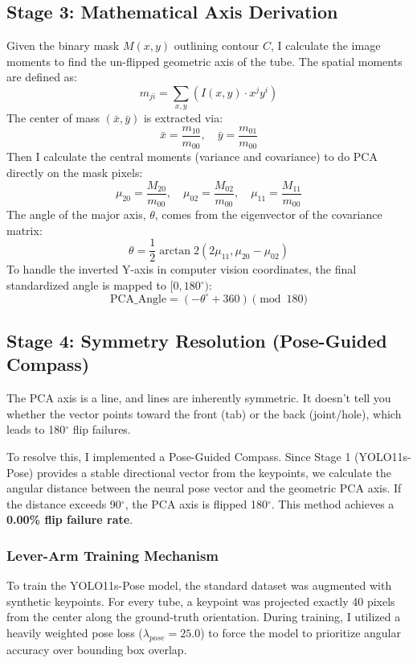 \documentclass[11pt,a4paper]{article}
\begin{document}
\subsection{Stage 3: Mathematical Axis Derivation}
Given the binary mask $M(x,y)$ outlining contour $C$, I calculate the image moments to find the un-flipped geometric axis of the tube. The spatial moments are defined as:
\begin{equation}
    m_{ji} = \sum_{x,y} \left(I(x,y) \cdot x^j y^i\right)
\end{equation}
The center of mass $(\bar{x}, \bar{y})$ is extracted via:
\begin{equation}
    \bar{x} = \frac{m_{10}}{m_{00}}, \quad \bar{y} = \frac{m_{01}}{m_{00}}
\end{equation}
Then I calculate the central moments (variance and covariance) to do PCA directly on the mask pixels:
\begin{equation}
    \mu_{20} = \frac{M_{20}}{m_{00}}, \quad \mu_{02} = \frac{M_{02}}{m_{00}}, \quad \mu_{11} = \frac{M_{11}}{m_{00}}
\end{equation}
The angle of the major axis, $\theta$, comes from the eigenvector of the covariance matrix:
\begin{equation}
    \theta = \frac{1}{2} \arctan2(2\mu_{11}, \mu_{20} - \mu_{02})
\end{equation}
To handle the inverted Y-axis in computer vision coordinates, the final standardized angle is mapped to $[0, 180^\circ)$:
\begin{equation}
    \text{PCA\_Angle} = (-\theta^\circ + 360) \pmod{180}
\end{equation}

\subsection{Stage 4: Symmetry Resolution (Pose-Guided Compass)}
The PCA axis is a line, and lines are inherently symmetric. It doesn't tell you whether the vector points toward the front (tab) or the back (joint/hole), which leads to 180$^\circ$ flip failures. 

To resolve this, I implemented a Pose-Guided Compass. Since Stage 1 (YOLO11s-Pose) provides a stable directional vector from the keypoints, we calculate the angular distance between the neural pose vector and the geometric PCA axis. If the distance exceeds 90$^\circ$, the PCA axis is flipped 180$^\circ$. This method achieves a \textbf{0.00\% flip failure rate}.

\subsubsection{Lever-Arm Training Mechanism}
To train the YOLO11s-Pose model, the standard dataset was augmented with synthetic keypoints. For every tube, a keypoint was projected exactly 40 pixels from the center along the ground-truth orientation. During training, I utilized a heavily weighted pose loss ($\lambda_{pose} = 25.0$) to force the model to prioritize angular accuracy over bounding box overlap.
\end{document}
